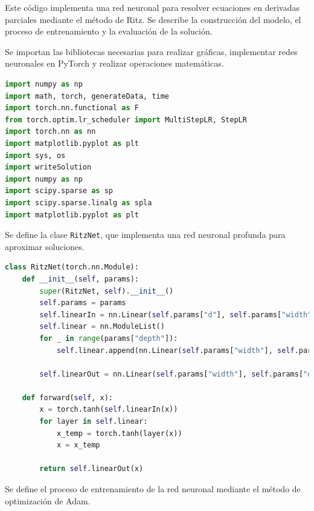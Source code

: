 \documentclass[a4paper,11pt,spanish, twoside, leqno]{tfg-uam}
\theoremstyle{definition}
\begin{document}
Este código implementa una red neuronal para resolver ecuaciones en derivadas parciales mediante el método de Ritz. Se describe la construcción del modelo, el proceso de entrenamiento y la evaluación de la solución.

Se importan las bibliotecas necesarias para realizar gráficas, implementar redes neuronales en PyTorch y realizar operaciones matemáticas.

\begin{lstlisting}[language=Python]
import numpy as np 
import math, torch, generateData, time
import torch.nn.functional as F
from torch.optim.lr_scheduler import MultiStepLR, StepLR
import torch.nn as nn
import matplotlib.pyplot as plt
import sys, os
import writeSolution
import numpy as np
import scipy.sparse as sp
import scipy.sparse.linalg as spla
import matplotlib.pyplot as plt
\end{lstlisting}

Se define la clase \texttt{RitzNet}, que implementa una red neuronal profunda para aproximar soluciones.

\begin{lstlisting}[language=Python]
class RitzNet(torch.nn.Module):
    def __init__(self, params):
        super(RitzNet, self).__init__()
        self.params = params
        self.linearIn = nn.Linear(self.params["d"], self.params["width"])
        self.linear = nn.ModuleList()
        for _ in range(params["depth"]):
            self.linear.append(nn.Linear(self.params["width"], self.params["width"]))

        self.linearOut = nn.Linear(self.params["width"], self.params["dd"])

    def forward(self, x):
        x = torch.tanh(self.linearIn(x)) 
        for layer in self.linear:
            x_temp = torch.tanh(layer(x))
            x = x_temp
        
        return self.linearOut(x)

\end{lstlisting}

Se define el proceso de entrenamiento de la red neuronal mediante el método de optimización de Adam.
\end{document}
